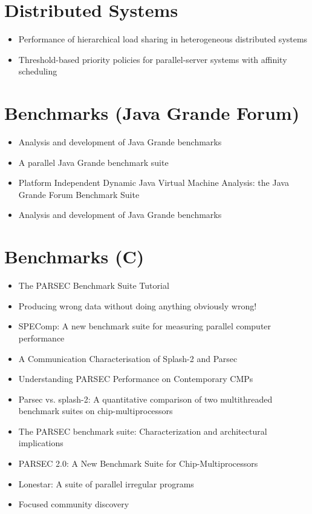 \section{Distributed Systems}
\label{sec:lr-distributed-systems}

\begin{itemize}
\item Performance of hierarchical load sharing in heterogeneous
  distributed systems \cite{Lo1996}
\item Threshold-based priority policies for parallel-server systems
  with affinity scheduling \cite{Squillante2001}
\end{itemize}


\section{Benchmarks (Java Grande Forum)}
\label{sec:lr-benchmarks}

\begin{itemize}
\item Analysis and development of Java Grande benchmarks
  \cite{Mathew1999}
\item A parallel Java Grande benchmark suite \cite{Smith2001}
\item Platform Independent Dynamic Java Virtual Machine Analysis: the
  Java Grande Forum Benchmark Suite \cite{Gregg2003}
\item Analysis and development of Java Grande benchmarks
  \cite{Mathew1999a}
\end{itemize}


\section{Benchmarks (C)}
\label{sec:lr-benchmarks}

\begin{itemize}
\item The PARSEC Benchmark Suite Tutorial \cite{Bienia2009}
\item Producing wrong data without doing anything obviously wrong!
  \cite{Mytkowicz2009}
\item SPEComp: A new benchmark suite for measuring parallel computer
  performance \cite{Aslot2001}
\item A Communication Characterisation of Splash-2 and Parsec
  \cite{Barrow-Williams2009}
\item Understanding PARSEC Performance on Contemporary CMPs
  \cite{Bhadauria}
\item Parsec vs. splash-2: A quantitative comparison of two
  multithreaded benchmark suites on chip-multiprocessors
  \cite{Bienia2008}
\item The PARSEC benchmark suite: Characterization and architectural
  implications \cite{Bienia2008a}
\item PARSEC 2.0: A New Benchmark Suite for Chip-Multiprocessors
  \cite{Bienia}
\item Lonestar: A suite of parallel irregular programs
  \cite{Kulkarni2009}
\item Focused community discovery \cite{Hildrum2005}
\end{itemize}

